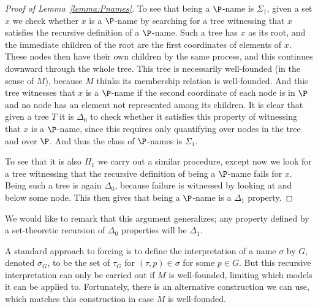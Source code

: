 \documentclass{amsart}
\begin{document}
\begin{proof}[Proof of Lemma~\ref{lemma:Pnames}]
To see that being a $\P$-name is $\Sigma_1$, given a set $x$ we check whether $x$ is a $\P$-name by searching for a tree witnessing that $x$ satisfies the recursive definition of a $\P$-name. Such a tree has $x$ as its root, and the immediate children of the root are the first coordinates of elements of $x$. These nodes then have their own children by the same process, and this continues downward through the whole tree. This tree is necessarily well-founded (in the sense of $M$), because $M$ thinks its membership relation is well-founded. And this tree witnesses that $x$ is a $\P$-name if the second coordinate of each node is in $\P$ and no node has an element not represented among its children. It is clear that given a tree $T$ it is $\Delta_0$ to check whether it satisfies this property of witnessing that $x$ is a $\P$-name, since this requires only quantifying over nodes in the tree and over $\P$. And thus the class of $\P$-names is $\Sigma_1$.

To see that it is also $\Pi_1$ we carry out a similar procedure, except now we look for a tree witnessing that the recursive definition of being a $\P$-name fails for $x$. Being such a tree is again $\Delta_0$, because failure is witnessed by looking at and below some node. This then gives that being a $\P$-name is a $\Delta_1$ property.
\end{proof}

We would like to remark that this argument generalizes; any property defined by a set-theoretic recursion of $\Delta_0$ properties will be $\Delta_1$.
\smallskip

A standard approach to forcing is to define the interpretation of a name $\sigma$ by $G$, denoted $\sigma_G$, to be the set of $\tau_G$ for $(\tau,p) \in \sigma$ for some $p \in G$. But this recursive interpretation can only be carried out if $M$ is well-founded, limiting which models it can be applied to. Fortunately, there is an alternative construction we can use, which matches this construction in case $M$ is well-founded.
\end{document}
